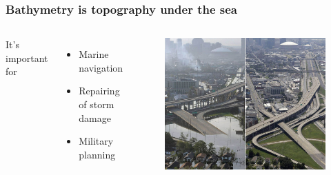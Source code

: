 \documentclass[7pt]{beamer}
\begin{document}
\begin{frame}
\frametitle{Bathymetry is topography under the sea}
\begin{columns}
It's important for 
\begin{itemize}
\item Marine navigation
\item Repairing of storm damage
\item Military planning
\end{itemize}
\begin{figure}[h]
\includegraphics[width=.80\linewidth]{img/Flood_D.jpg}\hfill

\end{figure}

\end{columns}





\end{frame}
\end{document}
